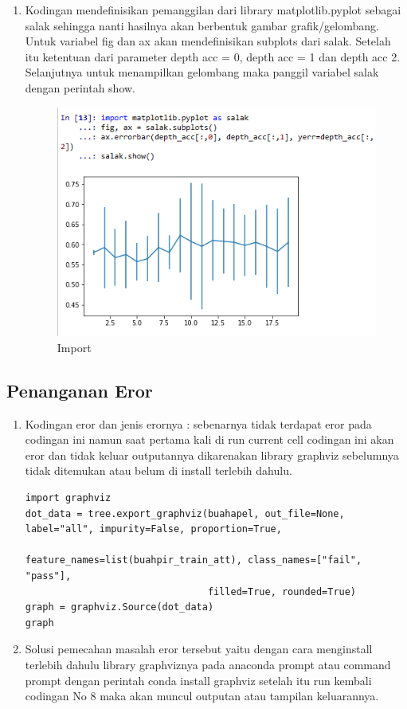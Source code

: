 \begin{enumerate}
\item Kodingan mendefinisikan pemanggilan dari library matplotlib.pyplot sebagai salak sehingga nanti hasilnya akan berbentuk gambar grafik/gelombang. Untuk variabel fig dan ax akan mendefinisikan subplots dari salak. Setelah itu ketentuan dari parameter depth acc = 0, depth acc = 1 dan depth acc 2. Selanjutnya untuk menampilkan gelombang maka panggil variabel salak dengan perintah show.
\begin{figure}[ht]
\centering
\includegraphics[scale=0.5]{figures/no12.png}
\caption{Import}
\label{Hasil}
\end{figure}
\end{enumerate}

\subsection{Penanganan Eror}
\begin{enumerate}
\item Kodingan eror dan jenis erornya : sebenarnya tidak terdapat eror pada codingan ini namun saat pertama kali di run current cell codingan ini akan eror dan tidak keluar outputannya dikarenakan library graphviz sebelumnya tidak ditemukan atau belum di install terlebih dahulu.
\subitem 
\begin{verbatim}
import graphviz
dot_data = tree.export_graphviz(buahapel, out_file=None, label="all", impurity=False, proportion=True,
                                feature_names=list(buahpir_train_att), class_names=["fail", "pass"], 
                                filled=True, rounded=True)
graph = graphviz.Source(dot_data)
graph
\end{verbatim}
\item Solusi pemecahan masalah eror tersebut yaitu dengan cara menginstall terlebih dahulu library graphviznya pada anaconda prompt atau command prompt dengan perintah conda install graphviz setelah itu run kembali codingan No 8 maka akan muncul outputan atau tampilan keluarannya.
\end{enumerate}

 